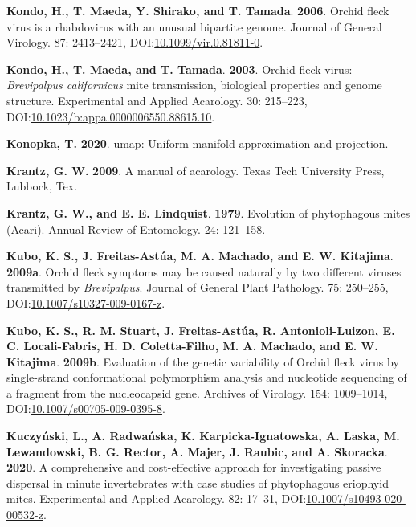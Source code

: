 \documentclass[12pt,final,CPage]{ufthesis}
\newlength{\cslhangindent}
\newenvironment{CSLReferences}[2] %
{%
	\setlength{\parindent}{0pt}
	\ifodd #1 \everypar{\setlength{\hangindent}{\cslhangindent}}\ignorespaces\fi
	\ifnum #2 > 0
	\setlength{\parskip}{#2\baselineskip}
	\fi
}%
{}
\begin{document}
{\begin{CSLReferences}{1}{0}
  \leavevmode{}%
  \textbf{Kondo, H., T. Maeda, Y. Shirako, and T. Tamada}. \textbf{2006}. {Orchid fleck virus} is a rhabdovirus with an unusual bipartite genome. Journal of General Virology. 87: 2413--2421, DOI:\href{https://doi.org/10.1099/vir.0.81811-0}{10.1099/vir.0.81811-0}.

  \leavevmode{}%
  \textbf{Kondo, H., T. Maeda, and T. Tamada}. \textbf{2003}. {Orchid fleck virus}: {\emph{Brevipalpus californicus}} mite transmission, biological properties and genome structure. Experimental and Applied Acarology. 30: 215--223, DOI:\href{https://doi.org/10.1023/b:appa.0000006550.88615.10}{10.1023/b:appa.0000006550.88615.10}.

  \leavevmode{}%
  \textbf{Konopka, T.} \textbf{2020}. {umap}: Uniform manifold approximation and projection.

  \leavevmode{}%
  \textbf{Krantz, G. W.} \textbf{2009}. A manual of acarology. Texas Tech University Press, Lubbock, Tex.

  \leavevmode{}%
  \textbf{Krantz, G. W., and E. E. Lindquist}. \textbf{1979}. Evolution of phytophagous mites ({Acari}). Annual Review of Entomology. 24: 121--158.

  \leavevmode{}%
  \textbf{Kubo, K. S., J. Freitas-Astúa, M. A. Machado, and E. W. Kitajima}. \textbf{2009a}. {Orchid fleck} symptoms may be caused naturally by two different viruses transmitted by {\emph{Brevipalpus}}. Journal of General Plant Pathology. 75: 250--255, DOI:\href{https://doi.org/10.1007/s10327-009-0167-z}{10.1007/s10327-009-0167-z}.

  \leavevmode{}%
  \textbf{Kubo, K. S., R. M. Stuart, J. Freitas-Astúa, R. Antonioli-Luizon, E. C. Locali-Fabris, H. D. Coletta-Filho, M. A. Machado, and E. W. Kitajima}. \textbf{2009b}. Evaluation of the genetic variability of {Orchid fleck virus} by single-strand conformational polymorphism analysis and nucleotide sequencing of a fragment from the nucleocapsid gene. Archives of Virology. 154: 1009--1014, DOI:\href{https://doi.org/10.1007/s00705-009-0395-8}{10.1007/s00705-009-0395-8}.

  \leavevmode{}%
  \textbf{Kuczyński, L., A. Radwańska, K. Karpicka-Ignatowska, A. Laska, M. Lewandowski, B. G. Rector, A. Majer, J. Raubic, and A. Skoracka}. \textbf{2020}. A comprehensive and cost-effective approach for investigating passive dispersal in minute invertebrates with case studies of phytophagous eriophyid mites. Experimental and Applied Acarology. 82: 17--31, DOI:\href{https://doi.org/10.1007/s10493-020-00532-z}{10.1007/s10493-020-00532-z}.


\end{CSLReferences}}
\end{document}
